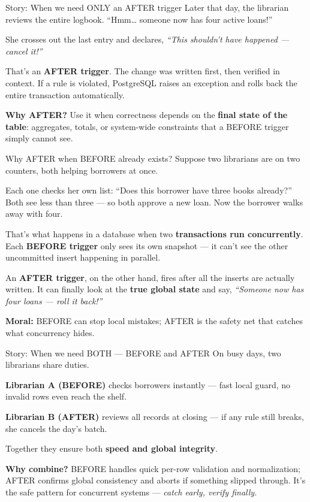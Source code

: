 \documentclass{beamer}
\begin{document}
\begin{frame}{Story: When we need ONLY an AFTER trigger}
\small
Later that day, the librarian reviews the entire logbook.  
“Hmm… someone now has four active loans!”  

She crosses out the last entry and declares,  
\textit{“This shouldn’t have happened — cancel it!”}  

That’s an \textbf{AFTER trigger}.  
The change was written first, then verified in context.  
If a rule is violated, PostgreSQL raises an exception  
and rolls back the entire transaction automatically.

\textcolor{nus-blue}{\textbf{Why AFTER?}}  
Use it when correctness depends on the \textbf{final state of the table}:  
aggregates, totals, or system-wide constraints  
that a BEFORE trigger simply cannot see.
\end{frame}

\begin{frame}{Why AFTER when BEFORE already exists?}
\small
Suppose two librarians are on two counters, both helping borrowers at once.

Each one checks her own list:  
“Does this borrower have three books already?”  
Both see less than three — so both approve a new loan.  
Now the borrower walks away with four.

That’s what happens in a database when two \textbf{transactions run concurrently}.  
Each \textbf{BEFORE trigger} only sees its own snapshot —  
it can’t see the other uncommitted insert happening in parallel.

An \textbf{AFTER trigger}, on the other hand,  
fires after all the inserts are actually written.  
It can finally look at the \textbf{true global state} and say,  
\textit{“Someone now has four loans — roll it back!”}

\textcolor{nus-blue}{\textbf{Moral:}}  
BEFORE can stop local mistakes;  
AFTER is the safety net that catches what concurrency hides.
\end{frame}

\begin{frame}{Story: When we need BOTH — BEFORE and AFTER}
\small
On busy days, two librarians share duties.  

\textbf{Librarian A (BEFORE)} checks borrowers instantly —  
fast local guard, no invalid rows even reach the shelf.  

\textbf{Librarian B (AFTER)} reviews all records at closing —  
if any rule still breaks, she cancels the day’s batch.  

Together they ensure both \textbf{speed and global integrity}.  

\textcolor{nus-blue}{\textbf{Why combine?}}  
BEFORE handles quick per-row validation and normalization;  
AFTER confirms global consistency and aborts if something slipped through.  
It’s the safe pattern for concurrent systems —  
\textit{catch early, verify finally.}
\end{frame}
\end{document}
